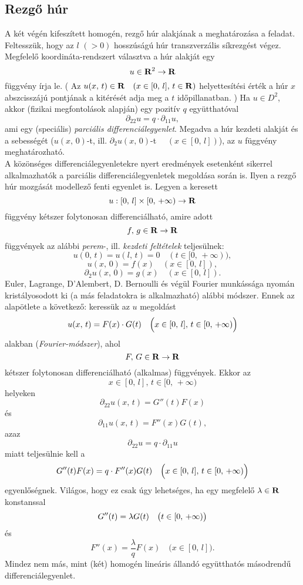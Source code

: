 \subsection{Rezgő húr}

A két végén kifeszített homogén, rezgő húr alakjának a meghatározása a feladat. Feltesszük, hogy az $l \, \, (>0)$ hosszúságú húr transzverzális síkrezgést végez. Megfelelő koordináta-rendszert választva a húr alakját egy
\[
	u \in \mathbf{R}^2 \to \mathbf{R}
\]
függvény írja le. ( Az $u(x, \, t) \in \mathbf{R} \quad (x \in [0, \, l], \, t \in \mathbf{R})$ helyettesítési érték a húr $x$ abszcisszájú pontjának a kitérését adja meg a $t$ időpillanatban. ) Ha $u \in D^2$, akkor (fizikai megfontolások alapján) egy pozitív $q$ együtthatóval
\[
	\partial_{22} u = q \cdot \partial_{11} u,
\]
ami egy (speciális) \textit{parciális differenciálegyenlet}. Megadva a húr kezdeti alakját és a sebességét ($u(x, \, 0)$-t, ill. $\partial_2u(x, \, 0)$-t $\quad (x \in [0, \, l])$), az $u$ függvény meghatározható. \\

A közönséges differenciálegyenletekre nyert eredmények esetenként sikerrel alkalmazhatók a parciális differenciálegyenletek megoldása során is. Ilyen a rezgő húr mozgását modellező fenti egyenlet is. Legyen a keresett
\[
	u : [0, \, l] \times [0, \, + \infty) \to \mathbf{R}
\]
függvény kétszer folytonosan differenciálható, amire adott
\[
	f, \, g \in \mathbf{R} \to \mathbf{R}
\]
függvények az alábbi \textit{perem}-, ill. \textit{kezdeti feltételek} teljesülnek:
\[
	u(0, \, t) = u(l, \, t) = 0 \quad (t \in [0, \, +\infty)),
\]
\[
	u(x, \, 0) = f(x) \quad (x \in [0, \, l]),
\]
\[
	\partial_2u(x, \, 0) = g(x) \quad (x \in [0, \, l]).
\]
Euler, Lagrange, D'Alembert, D. Bernoulli és végül Fourier munkássága nyomán kristályosodott ki (a más feladatokra is alkalmazható) alábbi módszer. Ennek az alapötlete a következő: keressük az $u$ megoldást
\[
	u(x, \, t) = F(x) \cdot G(t) \quad \Big(  x \in [0, \, l], \, t \in [0, \, + \infty)  \Big)
\]
alakban (\textit{Fourier-módszer}), ahol
\[
	F, \, G \in \mathbf{R} \to \mathbf{R}
\]
kétszer folytonosan differenciálható (alkalmas) függvények. Ekkor az
\[
	x \in [0, \, l], \, t \in [0, \, + \infty)
\]
helyeken
\[
	\partial_{22}u(x, \, t) = G''(t) F(x)
\]
és
\[
	\partial_{11}u(x, \, t) = F''(x) G(t),
\]
azaz
\[
	\partial_{22}u = q \cdot \partial_{11}u
\]
miatt teljesülnie kell a
\[
	G''(t) F(x) = q \cdot F''(x) G(t) \quad \Big(  x \in [0, \, l], \, t \in [0, \, + \infty)  \Big)
\]
egyenlőségnek. Világos, hogy ez csak úgy lehetséges, ha egy megfelelő $\lambda \in \mathbf{R}$ konstanssal
\[
	G''(t) = \lambda G(t) \quad \big(  t \in [0, \, + \infty) \big)
\]
és
\[
	F''(x) = \frac{\lambda}{q} F(x) \quad \big(x \in [0, \, l]\big).
\]
Mindez nem más, mint (két) homogén lineáris állandó együtthatós másodrendű differenciálegyenlet.\\

